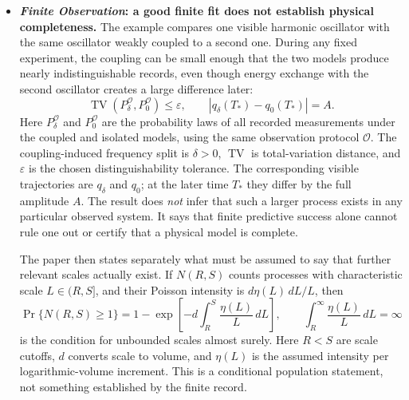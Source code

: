 \documentclass[10pt]{article}
\newcommand{\TV}{\operatorname{TV}}
\begin{document}
\begin{itemize}
\item \textbf{\emph{Finite Observation}: a good finite fit does not establish physical completeness.}
The example compares one visible harmonic oscillator with the same oscillator weakly coupled to a second one. During any fixed experiment, the coupling can be small enough that the two models produce nearly indistinguishable records, even though energy exchange with the second oscillator creates a large difference later:
\[
  \TV\!\left(P_\delta^{\mathcal O},P_0^{\mathcal O}\right)\leq\varepsilon,
  \qquad |q_\delta(T_*)-q_0(T_*)|=A.
\]
Here $P_\delta^{\mathcal O}$ and $P_0^{\mathcal O}$ are the probability laws of all recorded measurements under the coupled and isolated models, using the same observation protocol $\mathcal O$. The coupling-induced frequency split is $\delta>0$, $\TV$ is total-variation distance, and $\varepsilon$ is the chosen distinguishability tolerance. The corresponding visible trajectories are $q_\delta$ and $q_0$; at the later time $T_*$ they differ by the full amplitude $A$. The result does \emph{not} infer that such a larger process exists in any particular observed system. It says that finite predictive success alone cannot rule one out or certify that a physical model is complete.

The paper then states separately what must be assumed to say that further relevant scales actually exist. If $N(R,S)$ counts processes with characteristic scale $L\in(R,S]$, and their Poisson intensity is $d\eta(L)\,dL/L$, then
\[
  \Pr\{N(R,S)\geq1\}
  =1-\exp\!\left[-d\int_R^S\frac{\eta(L)}{L}\,dL\right],
  \qquad
  \int_R^\infty\frac{\eta(L)}{L}\,dL=\infty
\]
is the condition for unbounded scales almost surely. Here $R<S$ are scale cutoffs, $d$ converts scale to volume, and $\eta(L)$ is the assumed intensity per logarithmic-volume increment. This is a conditional population statement, not something established by the finite record.


\end{itemize}
\end{document}
